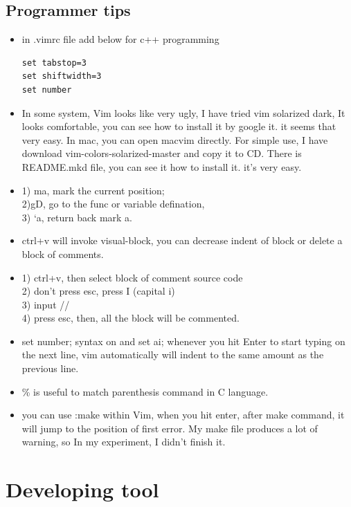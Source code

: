 \documentclass[a4paper,12pt,twoside]{book}
\begin{document}
\section{Programmer tips}
\begin{itemize}
 	\item in .vimrc file add below for c++ programming
	\begin{verbatim}
set tabstop=3
set shiftwidth=3
set number	
	\end{verbatim}

	\item In some system, Vim looks like very ugly, I have tried vim solarized dark, It looks comfortable, you can see how to install it by google it. it seems that very easy.  In mac, you can open macvim directly.  For simple use,  I have download vim-colors-solarized-master and copy it to CD. There is README.mkd file, you can see it how to install it. it's very easy.
	 
	\item  1) ma, mark the current position; \\
	           2)gD, go to the func or variable defination, \\
	           3) `a, return back mark a. \\ 
	 \item ctrl+v will invoke visual-block, you can decrease indent of block or delete a block of comments. 
	 
	 \item 1) ctrl+v, then select block of comment source code \\
	           2) don't press esc, press I (capital i) \\
	           3) input // \\
	           4) press esc, then, all the block will be commented.  
	 \item set number; syntax on and set ai;  whenever you hit Enter to start typing on the next line, vim automatically will indent to the same amount as the previous line.

	 \item \% is useful to match parenthesis command in C language. 
	 \item you can use :make within Vim, when you hit enter, after make command, it will jump to the position of first error. My make file produces a lot of warning, so In my experiment, I didn't finish it.  
	 
\end{itemize}


\chapter{Developing tool}
\end{document}
